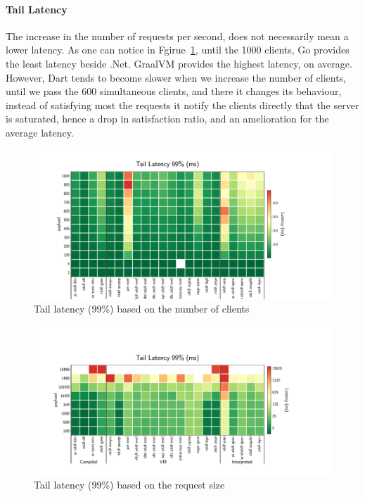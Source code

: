 \paragraph{Tail Latency}
The increase in the number of requests per second, does not necessarily mean a lower latency.
As one can notice in Fgirue~\ref{fig:tail99_clients}, until the 1000 clients, Go provides the least latency beside .Net.
GraalVM provides the highest latency, on average.
However, Dart tends to become slower when we increase the number of clients, until we pass the 600 simultaneous clients, and there it changes its behaviour, instead of satisfying most the requests it notify the clients directly that the server is saturated, hence a drop in satisfaction ratio, and an amelioration for the average latency.

\begin{figure}[!hbt]
    \begin{center}
        \includegraphics[width=1.2\linewidth]{imgs/tail99_clients}
    \end{center}
    \caption{Tail latency (99\%) based on the number of clients}\label{fig:tail99_clients}
\end{figure}


\begin{figure}[!hbt]
    \begin{center}
        \includegraphics[width=1.2\linewidth]{imgs/tail99_payload}
    \end{center}
    \caption{Tail latency (99\%) based on the request size}\label{fig:tail99_payload}
\end{figure}


